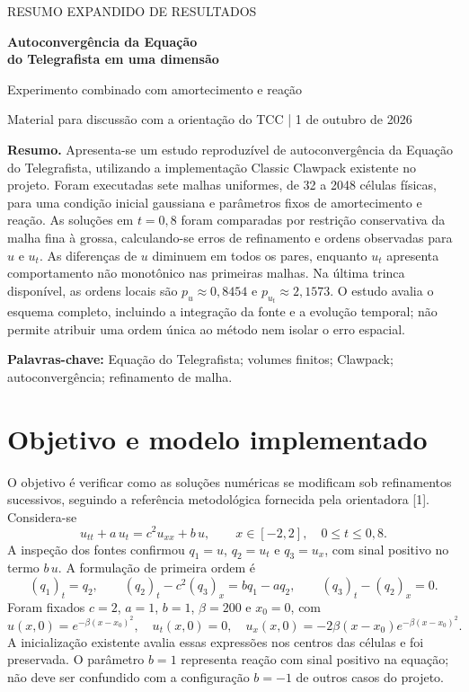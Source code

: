 \documentclass[11pt,a4paper]{article}
\newcommand{\secao}[1]{\section{\texorpdfstring{\color{azul}#1}{#1}}}
\begin{document}
\thispagestyle{empty}
\begin{center}
{\small\color{azul} RESUMO EXPANDIDO DE RESULTADOS}\par\medskip
{\LARGE\bfseries\color{azul} Autoconvergência da Equação\\[3pt] do Telegrafista em uma dimensão}\par\medskip
{\large Experimento combinado com amortecimento e reação}\par\smallskip
{\small Material para discussão com a orientação do TCC | 1 de outubro de 2026}
\end{center}
\vspace{2mm}
\noindent\textbf{Resumo.} Apresenta-se um estudo reproduzível de autoconvergência
da Equação do Telegrafista, utilizando a implementação Classic Clawpack existente
no projeto. Foram executadas sete malhas uniformes, de 32 a 2048 células físicas,
para uma condição inicial gaussiana e parâmetros fixos de amortecimento e reação.
As soluções em $t=0{,}8$ foram comparadas por restrição conservativa da malha fina
à grossa, calculando-se erros de refinamento e ordens observadas para $u$ e $u_t$.
As diferenças de $u$ diminuem em todos os pares, enquanto $u_t$ apresenta
comportamento não monotônico nas primeiras malhas. Na última trinca disponível,
as ordens locais são $p_u\approx0{,}8454$ e $p_{u_t}\approx2{,}1573$.
O estudo avalia o esquema completo, incluindo a integração da fonte e a evolução
temporal; não permite atribuir uma ordem única ao método nem isolar o erro espacial.
\par\smallskip
\noindent\textbf{Palavras-chave:} Equação do Telegrafista; volumes finitos;
Clawpack; autoconvergência; refinamento de malha.

\secao{Objetivo e modelo implementado}
O objetivo é verificar como as soluções numéricas se modificam sob refinamentos
sucessivos, seguindo a referência metodológica fornecida pela orientadora [1].
Considera-se
\begin{equation}
 u_{tt}+a\,u_t=c^2u_{xx}+b\,u,\qquad x\in[-2,2],\quad 0\leq t\leq0{,}8.
\end{equation}
A inspeção dos fontes confirmou $q_1=u$, $q_2=u_t$ e $q_3=u_x$, com
sinal positivo no termo $b\,u$. A formulação de primeira ordem é
\begin{equation}
 (q_1)_t=q_2,\qquad (q_2)_t-c^2(q_3)_x=bq_1-aq_2,
 \qquad (q_3)_t-(q_2)_x=0.
\end{equation}
Foram fixados $c=2$, $a=1$, $b=1$, $\beta=200$ e $x_0=0$, com
\begin{equation}
 u(x,0)=e^{-\beta(x-x_0)^2},\quad u_t(x,0)=0,\quad
 u_x(x,0)=-2\beta(x-x_0)e^{-\beta(x-x_0)^2}.
\end{equation}
A inicialização existente avalia essas expressões nos centros das células e foi
preservada. O parâmetro $b=1$ representa reação com sinal positivo na equação;
não deve ser confundido com a configuração $b=-1$ de outros casos do projeto.
\end{document}
